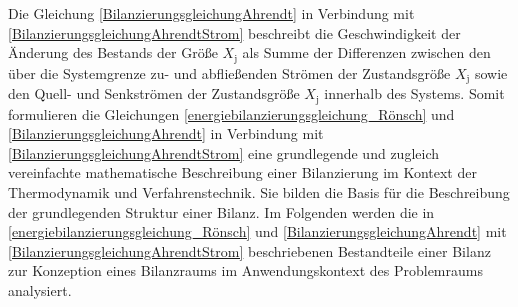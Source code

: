 Die Gleichung \eqref{BilanzierungsgleichungAhrendt} in Verbindung mit \eqref{BilanzierungsgleichungAhrendtStrom} beschreibt die Geschwindigkeit 
der Änderung des Bestands der Größe \(X_{\text{j}}\) als Summe der Differenzen zwischen den über die Systemgrenze zu- und abfließenden Strömen der 
Zustandsgröße \(X_{\text{j}}\) sowie den Quell- und Senkströmen der Zustandsgröße \(X_{\text{j}}\) innerhalb des Systems.  
Somit formulieren die Gleichungen \eqref{energiebilanzierungsgleichung_Rönsch} und \eqref{BilanzierungsgleichungAhrendt} in Verbindung mit 
\eqref{BilanzierungsgleichungAhrendtStrom} eine grundlegende und zugleich vereinfachte mathematische Beschreibung einer Bilanzierung im Kontext 
der Thermodynamik und Verfahrenstechnik. Sie bilden die Basis für die Beschreibung der grundlegenden Struktur einer Bilanz.
Im Folgenden werden die in \eqref{energiebilanzierungsgleichung_Rönsch} und \eqref{BilanzierungsgleichungAhrendt} mit \eqref{BilanzierungsgleichungAhrendtStrom} 
beschriebenen Bestandteile einer Bilanz zur Konzeption eines Bilanzraums im Anwendungskontext des Problemraums analysiert. 

